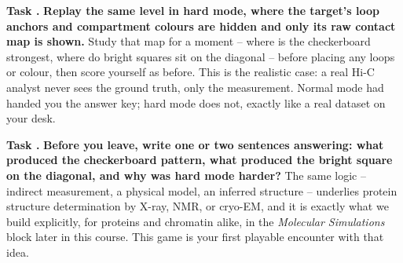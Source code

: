 \documentclass[11pt]{article}
\newcounter{tasknum}
\newcommand{\task}[1]{%
	\stepcounter{tasknum}%
	\par\vspace{8pt}\noindent%
	{\color{accent}\textbf{Task \thetasknum.}} \textbf{#1} }
\begin{document}
\task{Replay the same level in \textbf{hard mode}, where the target's loop
anchors and compartment colours are hidden and only its raw contact map is
shown.}%
Study that map for a moment -- where is the checkerboard strongest, where do
bright squares sit on the diagonal -- before placing any loops or colour, then
score yourself as before. This is the realistic case: a real Hi-C analyst
never sees the ground truth, only the measurement. Normal mode had handed you
the answer key; hard mode does not, exactly like a real dataset on your desk.

\task{Before you leave, write one or two sentences answering: what produced
the checkerboard pattern, what produced the bright square on the diagonal, and
why was hard mode harder?}%
The same logic -- indirect measurement, a physical model, an inferred
structure -- underlies protein structure determination by X-ray, NMR, or
cryo-EM, and it is exactly what we build explicitly, for proteins and
chromatin alike, in the \emph{Molecular Simulations} block later in this
course. This game is your first playable encounter with that idea.
\end{document}
